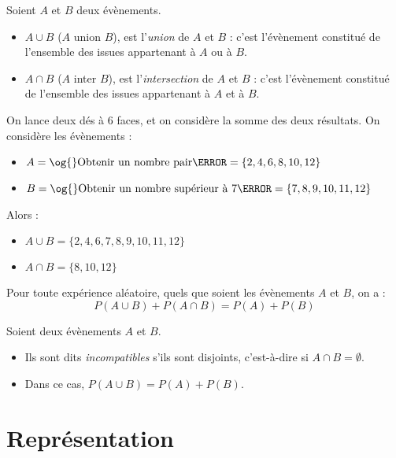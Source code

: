 \begin{definition}Soient $A$ et $B$ deux évènements.
  \begin{itemize}
    \item $A \cup B$ (\og{}$A$ union $B$\fg{}), est l'\emph{union} de $A$ et $B$ : c'est l'évènement constitué de l'ensemble des issues appartenant à $A$ ou à $B$.
    \item $A \cap B$ (\og{}$A$ inter $B$\fg{}), est l'\emph{intersection} de $A$ et $B$ : c'est l'évènement constitué de l'ensemble des issues appartenant à $A$ et à $B$.
  \end{itemize}
\end{definition}

\begin{exemple}On lance deux dés à 6 faces, et on considère la somme des deux résultats. On considère les évènements :
  \begin{itemize}
    \item $A=\text{\og{}Obtenir un nombre pair\fg{}}=\{2, 4, 6, 8, 10, 12\}$
    \item $B=\text{\og{}Obtenir un nombre supérieur à 7\fg{}}=\{7, 8, 9, 10, 11, 12\}$
  \end{itemize}

  Alors :

  \begin{itemize}
    \item $A\cup B=\{2, 4, 6, 7, 8, 9, 10, 11, 12\}$
    \item $A\cap B=\{8, 10, 12\}$
  \end{itemize}
\end{exemple}

\begin{propriete}
  Pour toute expérience aléatoire, quels que soient les évènements $A$ et $B$,
  on a :
  \[P(A\cup B) + P(A\cap B) = P(A) + P(B)\]
\end{propriete}

\begin{defprop}Soient deux évènements $A$ et $B$.
  \begin{itemize}
    \item Ils sont dits \emph{incompatibles} s'ils sont disjoints, c'est-à-dire si $A\cap B=\emptyset$.
    \item Dans ce cas, $P(A\cup B)=P(A)+P(B)$.
  \end{itemize}
\end{defprop}

\section{Représentation}


